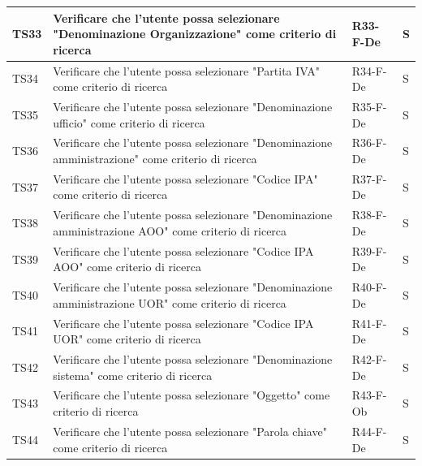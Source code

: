 \documentclass[a4paper,12pt]{article}
\begin{document}
\begin{longtable}{|M{1.2cm}|M{6.3cm}|M{2.5cm}|M{1.5cm}|}
                TS33 & Verificare che l'utente possa selezionare "Denominazione Organizzazione" come criterio di ricerca & R33-F-De & S \\
                \hline

                TS34 & Verificare che l'utente possa selezionare "Partita IVA" come criterio di ricerca & R34-F-De & S \\
                \hline

                TS35 & Verificare che l'utente possa selezionare "Denominazione ufficio" come criterio di ricerca & R35-F-De & S \\
                \hline

                TS36 & Verificare che l'utente possa selezionare "Denominazione amministrazione" come criterio di ricerca & R36-F-De & S \\
                \hline

                TS37 & Verificare che l'utente possa selezionare "Codice IPA" come criterio di ricerca & R37-F-De & S \\
                \hline

                TS38 & Verificare che l'utente possa selezionare "Denominazione amministrazione AOO" come criterio di ricerca & R38-F-De & S \\
                \hline

                TS39 & Verificare che l'utente possa selezionare "Codice IPA AOO" come criterio di ricerca & R39-F-De & S \\
                \hline

                TS40 & Verificare che l'utente possa selezionare "Denominazione amministrazione UOR" come criterio di ricerca & R40-F-De & S \\
                \hline

                TS41 & Verificare che l'utente possa selezionare "Codice IPA UOR" come criterio di ricerca & R41-F-De & S \\
                \hline

                TS42 & Verificare che l'utente possa selezionare "Denominazione sistema" come criterio di ricerca & R42-F-De & S \\
                \hline

                TS43 & Verificare che l'utente possa selezionare "Oggetto" come criterio di ricerca & R43-F-Ob & S \\
                \hline

                TS44 & Verificare che l'utente possa selezionare "Parola chiave" come criterio di ricerca & R44-F-De & S \\
                \hline


\end{longtable}
\end{document}
